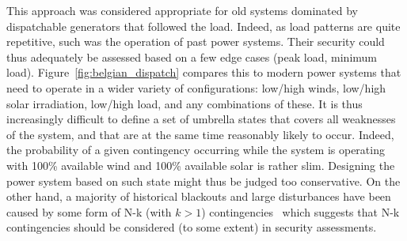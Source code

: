 This approach was considered appropriate for old systems dominated by dispatchable generators that followed the load. Indeed, as load patterns are quite repetitive, such was the operation of past power systems. Their security could thus adequately be assessed based on a few edge cases (peak load, minimum load). Figure~\ref{fig:belgian_dispatch} compares this to modern power systems that need to operate in a wider variety of configurations: low/high winds, low/high solar irradiation, low/high load, and any combinations of these. It is thus increasingly difficult to define a set of umbrella states that covers all weaknesses of the system, and that are at the same time reasonably likely to occur. Indeed, the probability of a given contingency occurring while the system is operating with 100\% available wind and 100\% available solar is rather slim. Designing the power system based on such state might thus be judged too conservative. On the other hand, a majority of historical blackouts and large disturbances have been caused by some form of N-k (with \(k > 1\)) contingencies~\cite{majorBlackouts, CascadingMethodoAndChallenges} which suggests that N-k contingencies should be considered (to some extent) in security assessments.

